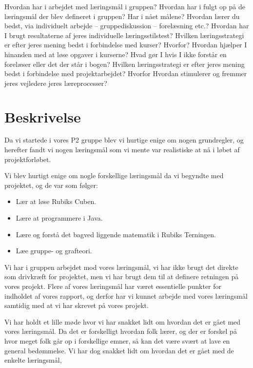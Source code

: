 Hvordan har i arbejdet med l\ae{}ringsm\aa{}l i gruppen?
Hvordan har i fulgt op p\aa{} de l\ae{}ringsm\aa{}l der blev defineret i gruppen? Har i n\aa{}et m\aa{}lene?
Hvordan l\ae{}rer du bedst, via individuelt arbejde – gruppediskussion – forel\ae{}sning etc.?
Hvordan har I brugt resultaterne af jeres individuelle l\ae{}ringsstilstest?
Hvilken l\ae{}ringsstrategi er efter jeres mening bedst i forbindelse med kurser? Hvorfor?
Hvordan hj\ae{}lper I hinanden med at l\o{}se opgaver i kurserne?
Hvad g\o{}r I hvis I ikke forst\aa{}r en forel\ae{}ser eller det der st\aa{}r i bogen?
Hvilken l\ae{}ringsstrategi er efter jeres mening bedst i forbindelse med projektarbejdet? Hvorfor
Hvordan stimulerer og fremmer jeres vejledere jeres l\ae{}reprocesser?


\section{Beskrivelse}
Da vi startede i vores P2 gruppe blev vi hurtige enige om nogen grundregler, og herefter fandt vi nogen l\ae{}ringsm\aa{}l som vi mente var realistiske at n\aa{} i l\o{}bet af projektforl\o{}bet.

Vi blev hurtigt enige om nogle forskellige l\ae{}ringsm\aa{}l da vi begyndte med projektet, og de var som f\o{}lger:

\begin{itemize}
\item L\ae{}r at l\o{}se Rubiks Cuben.
\item L\ae{}re at programmere i Java.
\item L\ae{}re  og forst\aa{} det bagved liggende matematik i Rubiks Terningen. 
\item L\ae{}e gruppe- og grafteori.
\end{itemize}

Vi har i gruppen arbejdet mod vores l\ae{}ringsm\aa{}l, vi har ikke brugt det direkte som drivkr\ae{}ft for projektet, men vi har brugt dem til at definere retningen p\aa{} vores projekt.
Flere af vores l\ae{}ringsm\aa{}l har v\ae{}ret essentielle punkter for indholdet af vores rapport, og derfor har vi kunnet arbejde med vores l\ae{}ringsm\aa{}l samtidig med at vi har skrevet p\aa{} vores projekt.

Vi har holdt et lille m\o{}de hvor vi har snakket lidt om hvordan det er g\aa{}et med vores l\ae{}ringsm\aa{}l. Da det er forskelligt hvordan folk l\ae{}rer, og der er forskel p\aa{} hvor meget folk g\aa{}r op i forskellige emner, s\aa{} kan det v\ae{}re sv\ae{}rt at lave en general bed\o{}mmelse. Vi har dog snakket lidt om hvordan det er g\aa{}et med de enkelte l\ae{}ringsm\aa{}l,

